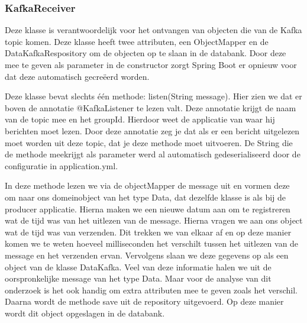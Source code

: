 \subsubsection{KafkaReceiver}
Deze klasse is verantwoordelijk voor het ontvangen van objecten die van de Kafka topic komen. Deze klasse heeft twee attributen, een ObjectMapper en de DataKafkaRespository om de objecten op te slaan in de databank. Door deze mee te geven als parameter in de constructor zorgt Spring Boot er opnieuw voor dat deze automatisch gecreëerd worden.

Deze klasse bevat slechts één methode: listen(String message). Hier zien we dat er boven de annotatie @KafkaListener te lezen valt. Deze annotatie krijgt de naam van de topic mee en het groupId. Hierdoor weet de applicatie van waar hij berichten moet lezen. Door deze annotatie zeg je dat als er een bericht uitgelezen moet worden uit deze topic, dat je deze methode moet uitvoeren. De String die de methode meekrijgt als parameter werd al automatisch gedeserialiseerd door de configuratie in application.yml. 

In deze methode lezen we via de objectMapper de message uit en vormen deze om naar ons domeinobject van het type Data, dat dezelfde klasse is als bij de producer applicatie. Hierna maken we een nieuwe datum aan om te registreren wat de tijd was van het uitlezen van de message. Hierna vragen we aan ons object wat de tijd was van verzenden. Dit trekken we van elkaar af en op deze manier komen we te weten hoeveel milliseconden het verschilt tussen het uitlezen van de message en het verzenden ervan. Vervolgens slaan we deze gegevens op als een object van de klasse DataKafka. Veel van deze informatie halen we uit de oorspronkelijke message van het type Data. Maar voor de analyse van dit onderzoek is het ook handig om extra attributen mee te geven zoals het verschil. Daarna wordt de methode save uit de repository uitgevoerd. Op deze manier wordt dit object opgeslagen in de databank.

